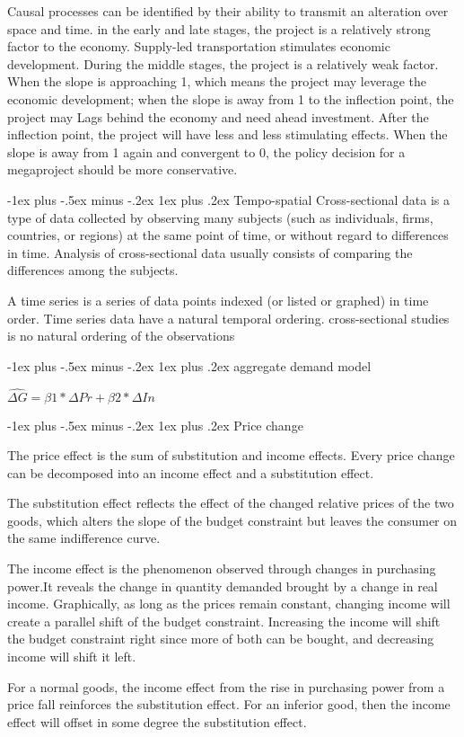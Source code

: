 \documentclass[10pt,portrait]{article}
\makeatletter
\renewcommand{\subsubsection}{\@startsection{subsubsection}{3}{0mm}%
                                {-1ex plus -.5ex minus -.2ex}%
                                {1ex plus .2ex}%
                                {\normalfont\small\bfseries}}
\makeatother
\begin{document}
\begin{multicols}{2}
Causal processes can be identified by their ability to transmit an alteration over space and time.  in the early and late stages, the project is a relatively strong factor to the economy. Supply-led transportation stimulates economic development. During the middle stages, the project is a relatively weak factor. When the slope is approaching 1, which means the project may leverage the economic development; when the slope is away from 1 to the inflection point, the project may Lags behind the economy and need ahead investment. After the inflection point, the project will have less and less stimulating effects. When the slope is away from 1 again and convergent to 0, the policy decision for a megaproject should be more conservative. 

\subsubsection{Tempo-spatial}
Cross-sectional data is a type of data collected by observing many subjects (such as individuals, firms, countries, or regions) at the same point of time, or without regard to differences in time. Analysis of cross-sectional data usually consists of comparing the differences among the subjects.

A time series is a series of data points indexed (or listed or graphed) in time order. Time series data have a natural temporal ordering. cross-sectional studies is no natural ordering of the observations 

\subsubsection{aggregate demand model}

$\widehat{\Delta G}=\beta1*\Delta Pr+\beta2*\Delta In$


\subsubsection{Price change}

The price effect is the sum of substitution and income effects. Every price change can be decomposed into an income effect and a substitution effect. 

The substitution effect reflects the effect of the changed relative prices of the two goods, which alters the slope of the budget constraint but leaves the consumer on the same indifference curve.  

The income effect is the phenomenon observed through changes in purchasing power.It reveals the change in quantity demanded brought by a change in real income. Graphically, as long as the prices remain constant, changing income will create a parallel shift of the budget constraint. Increasing the income will shift the budget constraint right since more of both can be bought, and decreasing income will shift it left.

For a normal goods, the income effect from the rise in purchasing power from a price fall reinforces the substitution effect. For an inferior good, then the income effect will offset in some degree the substitution effect.

\end{multicols}
\end{document}
